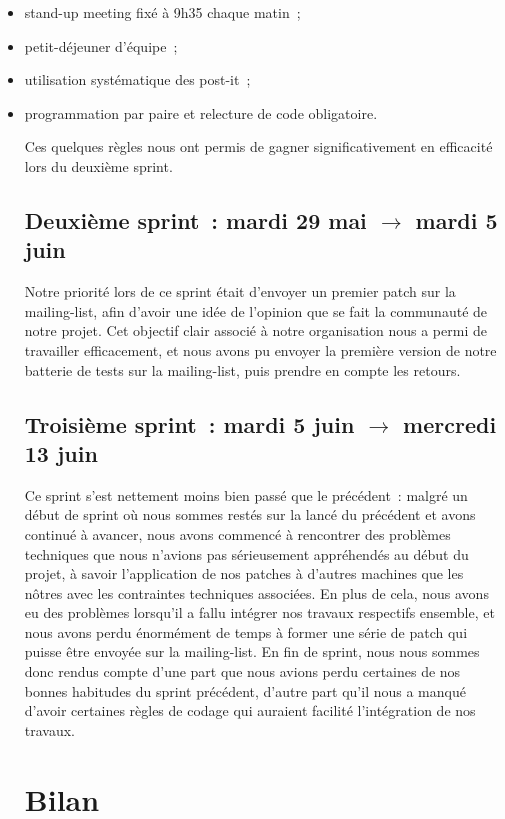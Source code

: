 \documentclass[11pt]{article}
\begin{document}
\begin{itemize}
\item stand-up meeting fixé à 9h35 chaque matin~;
\item petit-déjeuner d'équipe~;
\item utilisation systématique des post-it~;
\item programmation par paire et relecture de code obligatoire.

Ces quelques règles nous ont permis de gagner significativement en
efficacité lors du deuxième sprint.

\subsection{Deuxième sprint~: mardi 29 mai $\rightarrow$ mardi 5 juin}

Notre priorité lors de ce sprint était d'envoyer un premier patch sur
la mailing-list, afin d'avoir une idée de l'opinion que se fait la
communauté de notre projet. Cet objectif clair associé à notre
organisation nous a permi de travailler efficacement, et nous avons pu
envoyer la première version de notre batterie de tests sur la
mailing-list, puis prendre en compte les retours.

\subsection{Troisième sprint~: mardi 5 juin $\rightarrow$ mercredi 13 juin}

Ce sprint s'est nettement moins bien passé que le précédent~: malgré
un début de sprint où nous sommes restés sur la lancé du précédent et
avons continué à avancer, nous avons commencé à rencontrer des
problèmes techniques que nous n'avions pas sérieusement appréhendés au
début du projet, à savoir l'application de nos patches à d'autres
machines que les nôtres avec les contraintes techniques
associées. En plus de cela, nous avons eu des problèmes lorsqu'il a
fallu intégrer nos travaux respectifs ensemble, et nous avons perdu
énormément de temps à former une série de patch qui puisse être
envoyée sur la mailing-list. En fin de sprint, nous nous sommes donc
rendus compte d'une part que nous avions perdu certaines de nos bonnes
habitudes du sprint précédent, d'autre part qu'il nous a manqué
d'avoir certaines règles de codage qui auraient facilité l'intégration
de nos travaux.

\section{Bilan}


\end{itemize}
\end{document}
